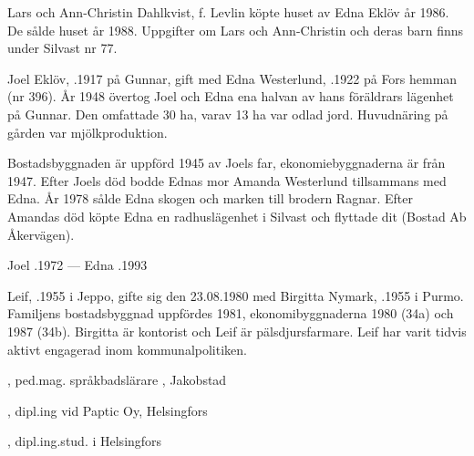 Lars och Ann-Christin Dahlkvist, f. Levlin  köpte huset av Edna Eklöv år 1986. De sålde huset år 1988. Uppgifter om Lars och Ann-Christin och deras barn finns under Silvast nr 77.


Joel Eklöv, .1917 på Gunnar, gift med Edna Westerlund, .1922 på Fors hemman (nr 396). År 1948 övertog Joel och Edna ena halvan av hans föräldrars lägenhet på Gunnar. Den omfattade 30 ha, varav 13 ha var odlad jord. Huvudnäring på gården var mjölkproduktion.

Bostadsbyggnaden är uppförd 1945 av Joels far, ekonomiebyggnaderna är från 1947. Efter Joels död bodde Ednas mor Amanda Westerlund tillsammans med Edna. År 1978 sålde Edna skogen och marken till brodern Ragnar. Efter Amandas död köpte Edna en radhuslägenhet i Silvast och flyttade dit (Bostad Ab Åkervägen).

Joel .1972  ---  Edna .1993





Leif, .1955 i Jeppo, gifte sig den 23.08.1980 med Birgitta Nymark, .1955 i Purmo. Familjens bostadsbyggnad uppfördes 1981, ekonomibyggnaderna 1980 (34a) och 1987 (34b). Birgitta är kontorist och Leif är pälsdjursfarmare. Leif har varit tidvis aktivt engagerad inom kommunalpolitiken.
\begin{jhchildren}
  \item {}, ped.mag. språkbadslärare , Jakobstad
  \item {}, dipl.ing vid Paptic Oy, Helsingfors
  \item {}, dipl.ing.stud. i Helsingfors
\end{jhchildren}






